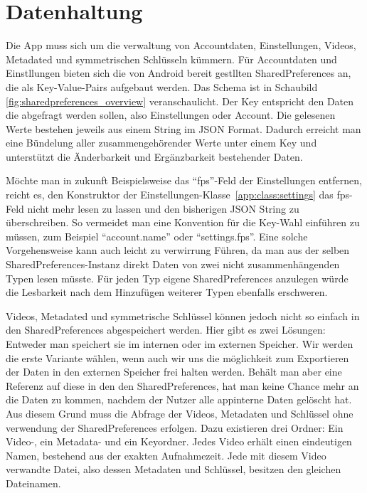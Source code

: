 \section{Datenhaltung}
Die App muss sich um die verwaltung von Accountdaten, Einstellungen, Videos, Metadated und symmetrischen Schlüsseln kümmern. Für Accountdaten und  Einstllungen bieten sich die von Android bereit gestllten SharedPreferences an, die als Key-Value-Pairs aufgebaut werden. Das Schema ist in Schaubild \ref{fig:sharedpreferences_overview} veranschaulicht. Der Key entspricht den Daten die abgefragt werden sollen, also Einstellungen oder Account. Die gelesenen Werte bestehen jeweils aus einem String im JSON Format. Dadurch erreicht man eine Bündelung aller zusammengehörender Werte unter einem Key und unterstützt die Änderbarkeit und Ergänzbarkeit bestehender Daten.\newline\par

Möchte man in zukunft Beispielsweise das ``fps''-Feld der Einstellungen entfernen, reicht es, den Konstruktor der Einstellungen-Klasse~\eqref{app:class:settings} das fps-Feld nicht mehr lesen zu lassen und den bisherigen JSON String zu überschreiben. So vermeidet man eine Konvention für die Key-Wahl einführen zu müssen, zum Beispiel ``account.name'' oder ``settings.fps''. Eine solche Vorgehensweise kann auch leicht zu verwirrung Führen, da man aus der selben SharedPreferences-Instanz direkt Daten von zwei nicht zusammenhängenden Typen lesen müsste. Für jeden Typ eigene SharedPreferences anzulegen würde die Lesbarkeit nach dem Hinzufügen weiterer Typen ebenfalls erschweren.

Videos, Metadated und symmetrische Schlüssel können jedoch nicht so einfach in den SharedPreferences abgespeichert werden. Hier gibt es zwei Lösungen: Entweder man speichert sie im internen oder im externen Speicher. Wir werden die erste Variante wählen, wenn auch wir uns die möglichkeit zum Exportieren der Daten in den externen Speicher frei halten werden. Behält man aber eine Referenz auf diese in den den SharedPreferences, hat man keine Chance mehr an die Daten zu kommen, nachdem der Nutzer alle appinterne Daten gelöscht hat.\newline
Aus diesem Grund muss die Abfrage der Videos, Metadaten und Schlüssel ohne verwendung der SharedPreferences erfolgen. Dazu existieren drei Ordner: Ein Video-, ein Metadata- und ein Keyordner. Jedes Video erhält einen eindeutigen Namen, bestehend aus der exakten Aufnahmezeit. Jede mit diesem Video verwandte Datei, also dessen Metadaten und Schlüssel, besitzen den gleichen Dateinamen.\newline

